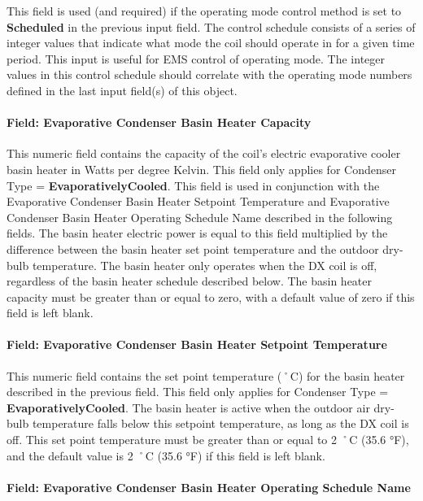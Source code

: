 This field is used (and required) if the operating mode control method is set to \textbf{Scheduled} in the previous input field. The control schedule consists of a series of integer values that indicate what mode the coil should operate in for a given time period. This input is useful for EMS control of operating mode. The integer values in this control schedule should correlate with the operating mode numbers defined in the last input field(s) of this object.

\paragraph{Field: Evaporative Condenser Basin Heater Capacity}\label{field-evaporative-condenser-basin-heater-capacity-000}

This numeric field contains the capacity of the coil's electric evaporative cooler basin heater in Watts per degree Kelvin. This field only applies for Condenser Type = \textbf{EvaporativelyCooled}. This field is used in conjunction with the Evaporative Condenser Basin Heater Setpoint Temperature and Evaporative Condenser Basin Heater Operating Schedule Name described in the following fields. The basin heater electric power is equal to this field multiplied by the difference between the basin heater set point temperature and the outdoor dry-bulb temperature. The basin heater only operates when the DX coil is off, regardless of the basin heater schedule described below. The basin heater capacity must be greater than or equal to zero, with a default value of zero if this field is left blank.

\paragraph{Field: Evaporative Condenser Basin Heater Setpoint Temperature}\label{field-evaporative-condenser-basin-heater-setpoint-temperature-000}

This numeric field contains the set point temperature (˚C) for the basin heater described in the previous field. This field only applies for Condenser Type = \textbf{EvaporativelyCooled}. The basin heater is active when the outdoor air dry-bulb temperature falls below this setpoint temperature, as long as the DX coil is off. This set point temperature must be greater than or equal to 2 ˚C (35.6 °F), and the default value is 2 ˚C (35.6 °F) if this field is left blank.

\paragraph{Field: Evaporative Condenser Basin Heater Operating Schedule Name}\label{field-evaporative-condenser-basin-heater-operating-schedule-name-000}

